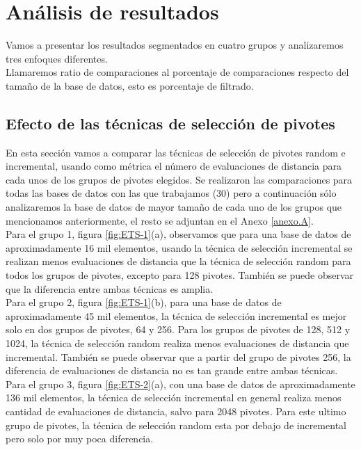 \section{An\'alisis de resultados}

Vamos a presentar los resultados segmentados en cuatro grupos y analizaremos tres enfoques diferentes.\\

Llamaremos ratio de comparaciones al porcentaje de comparaciones respecto del tamaño de la base de datos, esto es porcentaje de filtrado.\\

\subsection{Efecto de las t\'ecnicas de selecci\'on de pivotes}

En esta secci\'on vamos a comparar las t\'ecnicas de selecci\'on de pivotes random e incremental, usando como m\'etrica el n\'umero de evaluaciones de distancia para cada unos de los grupos de pivotes elegidos. Se realizaron las comparaciones para todas las bases de datos con las que trabajamos (30) pero a continuaci\'on s\'olo analizaremos la base de datos de mayor tama\~no de cada uno de los grupos que mencionamos anteriormente, el resto se adjuntan en el Anexo \ref{anexo.A}.\\

Para el grupo 1, figura \ref{fig:ETS-1}(a), observamos que para una base de datos de aproximadamente 16 mil elementos,  usando la t\'ecnica de selecci\'on incremental se realizan menos evaluaciones de distancia que la t\'ecnica de selecci\'on random para todos los grupos de pivotes, excepto para 128 pivotes. Tambi\'en se puede observar que la diferencia entre ambas t\'ecnicas es amplia.\\

Para el grupo 2, figura \ref{fig:ETS-1}(b), para una base de datos de aproximadamente 45 mil elementos, la t\'ecnica de selecci\'on incremental es mejor solo en dos grupos de pivotes, 64 y 256. Para los grupos de pivotes de 128, 512 y 1024, la t\'ecnica de selecci\'on random realiza menos evaluaciones de distancia que incremental. Tambi\'en se puede observar que a partir del grupo de pivotes 256, la diferencia de evaluaciones de distancia no es tan grande entre ambas t\'ecnicas.\\

Para el grupo 3, figura \ref{fig:ETS-2}(a), con una base de datos de aproximadamente 136 mil elementos, la t\'ecnica de selecci\'on incremental en general realiza menos cantidad de evaluaciones de distancia, salvo para 2048 pivotes. Para este ultimo grupo de pivotes, la t\'ecnica de selecci\'on random esta por debajo de incremental pero solo por muy poca diferencia.\\

